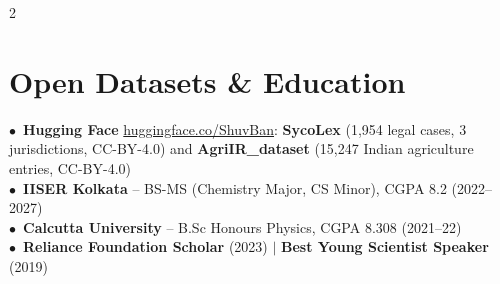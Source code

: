 \documentclass[a4paper,9pt]{article}
\begin{document}
\begin{paracol}{2}
	\section{Open Datasets \& Education}

	 {\tiny
	  $\bullet$~\textbf{Hugging Face} \href{https://huggingface.co/ShuvBan}{huggingface.co/ShuvBan}: \textbf{SycoLex} (1,954 legal cases, 3 jurisdictions, CC-BY-4.0) and \textbf{AgriIR\_dataset} (15,247 Indian agriculture entries, CC-BY-4.0)\\
	  $\bullet$~\textbf{IISER Kolkata} -- BS-MS (Chemistry Major, CS Minor), CGPA 8.2 (2022--2027)\\
	  $\bullet$~\textbf{Calcutta University} -- B.Sc Honours Physics, CGPA 8.308 (2021--22)\\
	  $\bullet$~\textbf{Reliance Foundation Scholar} (2023) $\mid$ \textbf{Best Young Scientist Speaker} (2019)
	 }

\end{paracol}
\end{document}
